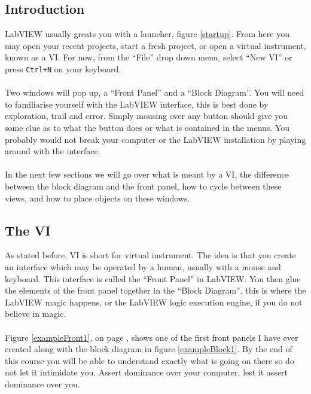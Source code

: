 	\subsection{Introduction}
	LabVIEW usually greats you with a launcher, figure \ref{startup}. From here you may open your recent projects, start a fresh project, or open a virtual instrument, known as a VI. For now, from the ``File'' drop down menu, select ``New VI'' or press \texttt{Ctrl+N} on your keyboard.\\
	\\
	Two windows will pop up, a ``Front Panel'' and a ``Block Diagram''. You will need to familiarise yourself with the LabVIEW interface, this is best done by exploration, trail and error. Simply mousing over any button should give you some clue as to what the button does or what is contained in the menus. You probably would not break your computer or the LabVIEW installation by playing around with the interface.\\
	\\
	In the next few sections we will go over what is meant by a VI, the difference between the block diagram and the front panel,
	how to cycle between these views, and how to place objects on these windows.
	\subsection{The VI}
	As stated before, VI is short for virtual instrument. The idea is that you create an interface which may be operated by a human, usually with a mouse and keyboard. This interface is called the ``Front Panel'' in LabVIEW. You then glue the elements of the front panel together in the ``Block Diagram'', this is where the LabVIEW magic happens, or the LabVIEW logic execution engine, if you do not believe in magic.\\
	\\
	Figure \ref{exampleFront1}, on page \pageref{exampleFront1}, shows one of the first front panels I have ever created along with the block diagram in figure \ref{exampleBlock1}. By the end of this course you will be able to understand exactly what is going on there so do not let it intimidate you. Assert dominance over your computer, lest it assert dominance over you. %
